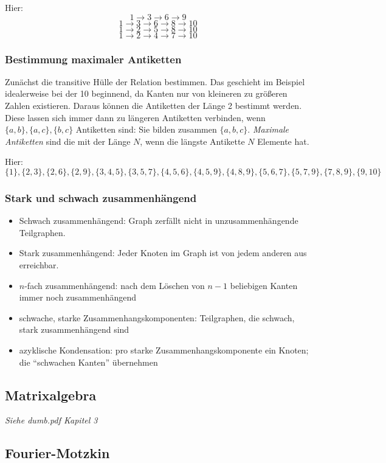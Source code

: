 Hier:
\[1 \rightarrow 3 \rightarrow 6 \rightarrow 9\]
\[1 \rightarrow 3 \rightarrow 6 \rightarrow 8 \rightarrow 10\]
\[1 \rightarrow 2 \rightarrow 5 \rightarrow 8 \rightarrow 10\]
\[1 \rightarrow 2 \rightarrow 4 \rightarrow 7 \rightarrow 10\]

\subsubsection{Bestimmung maximaler Antiketten}
Zunächst die transitive Hülle der Relation bestimmen. Das geschieht im Beispiel idealerweise
bei der 10 beginnend, da Kanten nur von kleineren zu größeren Zahlen existieren. Daraus können
die Antiketten der Länge 2 bestimmt werden. Diese lassen sich immer dann zu längeren Antiketten
verbinden, wenn $\{a,b\}, \{a,c\}, \{b, c\}$ Antiketten sind: Sie bilden zusammen $\{a,b,c\}$.
\textit{Maximale Antiketten} sind die mit der Länge $N$, wenn die längste Antikette $N$
Elemente hat.

Hier:
\[\{1\}, \{2,3\}, \{2,6\}, \{2,9\}, \{3, 4,5\}, \{3, 5, 7\}, \{4, 5, 6\}, \{4,5,9\}, \{4,8,9\},
\{5,6,7\},\{5,7,9\}, \{7,8,9\}, \{9,10\}\]

\subsubsection{Stark und schwach zusammenhängend}
\begin{itemize}
    \item Schwach zusammenhängend: Graph zerfällt nicht in unzusammenhängende Teilgraphen.
    \item Stark zusammenhängend: Jeder Knoten im Graph ist von jedem anderen aus erreichbar.
    \item $n$-fach zusammenhängend: nach dem Löschen von $n−1$ beliebigen Kanten immer noch zusammenhängend
    \item schwache, starke Zusammenhangskomponenten: Teilgraphen, die schwach, stark zusammenhängend sind
    \item azyklische Kondensation: pro starke Zusammenhangskomponente ein Knoten; die “schwachen Kanten” übernehmen
\end{itemize}

\subsection{Matrixalgebra}
\textit{Siehe dumb.pdf Kapitel 3}

\subsection{Fourier-Motzkin}